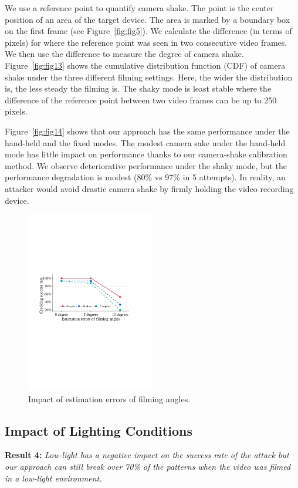     We use a reference point to quantify camera shake. The point
    is the center position of an area of the target device. The area is marked by a boundary box on the first
    frame (see Figure~\ref{fig:fig5}). We calculate the difference (in terms of pixels) for where the
    reference point was seen in two consecutive video frames. We then use the difference to measure the degree of camera shake.
    Figure~\ref{fig:fig13} shows the cumulative distribution function (CDF)
    of camera shake under the three different filming settings.
    Here, the wider the distribution is, the less steady the
     filming is. The shaky mode is least stable where the difference of the reference point between two video frames can be up to 250 pixels.


    Figure~\ref{fig:fig14} shows that our approach has the same performance under
    the hand-held and the fixed modes. The modest camera sake under the hand-held mode
    has little impact on performance thanks to our camera-shake calibration method. We observe deteriorative performance
    under the shaky mode, but the performance degradation is modest (80\% vs 97\%
    in 5 attempts). In reality, an attacker would avoid drastic
    camera shake by firmly holding the video recording device.

     \begin{figure}[!t]
        \centering
        \includegraphics[width=0.5\textwidth]{fig/15.pdf}
        \caption{Impact of estimation errors of filming angles.}
        \label{fig:fig15}
    \end{figure}


    \subsection{Impact of Lighting Conditions \label{sec:light}}
    \noindent \textbf{Result 4:} \emph{Low-light has a negative impact on the success rate of the attack but our approach can still break over 70\% of the patterns when the video was filmed in a low-light environment.}

